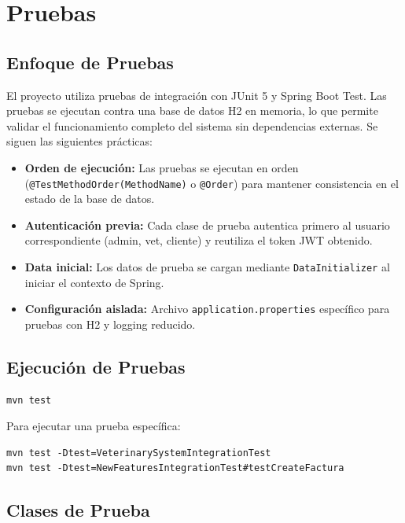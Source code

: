 \chapter{Pruebas}

\section{Enfoque de Pruebas}

El proyecto utiliza pruebas de integraci\'on con JUnit 5 y Spring Boot Test. Las pruebas se ejecutan contra una base de datos H2 en memoria, lo que permite validar el funcionamiento completo del sistema sin dependencias externas. Se siguen las siguientes pr\'acticas:

\begin{itemize}
    \item \textbf{Orden de ejecuci\'on:} Las pruebas se ejecutan en orden (\texttt{@TestMethodOrder(MethodName)} o \texttt{@Order}) para mantener consistencia en el estado de la base de datos.
    \item \textbf{Autenticaci\'on previa:} Cada clase de prueba autentica primero al usuario correspondiente (admin, vet, cliente) y reutiliza el token JWT obtenido.
    \item \textbf{Data inicial:} Los datos de prueba se cargan mediante \texttt{DataInitializer} al iniciar el contexto de Spring.
    \item \textbf{Configuraci\'on aislada:} Archivo \texttt{application.properties} espec\'ifico para pruebas con H2 y logging reducido.
\end{itemize}

\section{Ejecuci\'on de Pruebas}

\begin{lstlisting}[caption=Comando para ejecutar todas las pruebas]
mvn test
\end{lstlisting}

Para ejecutar una prueba espec\'ifica:

\begin{lstlisting}[caption=Ejecutar prueba individual]
mvn test -Dtest=VeterinarySystemIntegrationTest
mvn test -Dtest=NewFeaturesIntegrationTest#testCreateFactura
\end{lstlisting}

\section{Clases de Prueba}

